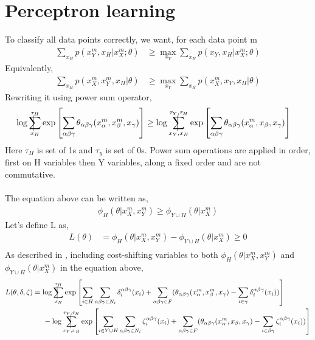 \documentclass{article}
\makeatletter
\newcommand{\avsum}{\mathop{\mathpalette\avsuminner\relax}\displaylimits}
\newcommand\avsuminner[2]{%
  {\sbox0{$\m@th#1\sum$}%
   \vphantom{\usebox0}%
   \ooalign{%
     \hidewidth
     \smash{\vrule height\dimexpr\ht0+1pt\relax depth\dimexpr\dp0+1pt\relax}%
     \hidewidth\cr
     $\m@th#1\sum$\cr
   }%
  }%
}
\makeatother
\begin{document}
\section{Perceptron learning}
To classify all data points correctly, we want, for each data point m
\begin{align*}
  \sum_{x_H} p(x_Y^m,x_H|x_X^m;\theta) &\geq \max_{x_Y}\sum_{x_H} p(x_Y,x_H|x_X^m;\theta)
\end{align*}
Equivalently,
\begin{align*}
  \sum_{x_H} p(x_X^m,x_Y^m,x_H|\theta) &\geq \max_{x_Y}\sum_{x_H} p(x_X^m,x_Y,x_H|\theta)
  \end{align*}
  Rewriting it using power sum operator,
  \begin{align*}
  \log\avsum_{x_H}^{\tau_H}\exp\left [\sum_{\alpha\beta\gamma}\theta_{\alpha\beta\gamma}(x_{\alpha}^m,x_{\beta}^m,x_{\gamma})\right ] &\geq \log\avsum_{x_Y,x_H}^{\tau_Y,\tau_H}\exp\left [\sum_{\alpha\beta\gamma}\theta_{\alpha\beta\gamma}(x_{\alpha}^m,x_{\beta},x_{\gamma})\right ]
\end{align*}
Here $\tau_H$ is set of 1s and $\tau_y$ is set of 0s. Power sum operations are applied in order, first on H variables then Y variables, along a fixed order and are not commutative.\\\\The equation above can be written as,
\begin{align*}
\phi_H(\theta|x_X^m,x_Y^m)\geq\phi_{Y\cup H}(\theta|x_X^m)
\end{align*}
Let's define L as,
\begin{align*}
  L(\theta)&=\phi_H(\theta|x_X^m,x_Y^m) - \phi_{Y\cup H}(\theta|x_X^m)\geq 0\\
  \end{align*}
As described in \cite{Ping2015}, including cost-shifting variables to both $\phi_H(\theta|x_X^m,x_Y^m)$ and $\phi_{Y\cup H}(\theta|x_X^m)$ in the equation above,
\begin{align*}
  L(\theta,\delta,\zeta)&=\log\avsum_{x_H}^{\tau_H}\exp\left [ \sum_{i\in H}\sum_{\alpha\beta\gamma \in N_i} \delta_i^{\alpha\beta\gamma}(x_i) + \sum_{\alpha\beta\gamma \in F}(\theta_{\alpha\beta\gamma}(x_{\alpha}^m,x_{\beta}^m,x_{\gamma})-\sum_{i\in \gamma}\delta_i^{\alpha\beta\gamma}(x_i)) \right ] \\&\hspace{5mm}-\log\avsum_{x_Y,x_H}^{\tau_Y,\tau_H}\exp\left [ \sum_{i\in Y\cup H}\sum_{\alpha\beta\gamma \in N_i} \zeta_i^{\alpha\beta\gamma}(x_i) + \sum_{\alpha\beta\gamma \in F}(\theta_{\alpha\beta\gamma}(x_{\alpha}^m,x_{\beta},x_{\gamma})-\sum_{i\in \beta\gamma}\zeta_i^{\alpha\beta\gamma}(x_i)) \right ] 
  \end{align*}
\end{document}
